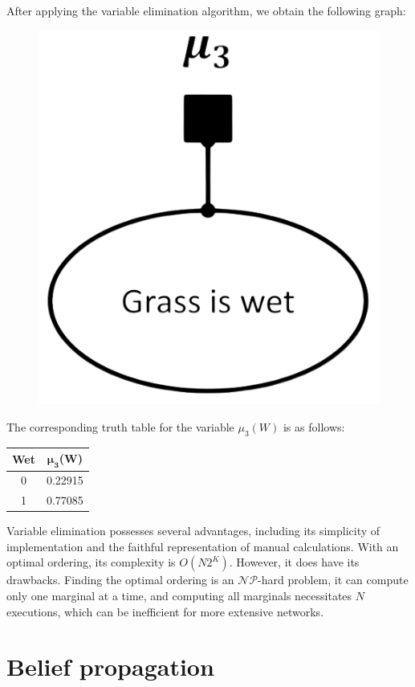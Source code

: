 \documentclass[12pt, a4paper]{report}
\begin{document}
\begin{example}
\begin{figure}[H]
        \end{figure} 
        After applying the variable elimination algorithm, we obtain the following graph:
        \begin{figure}[H]
            \centering
            \includegraphics[width=0.15\linewidth]{images/fg1.png}
        \end{figure} 
        The corresponding truth table for the variable $\mu_3(W)$ is as follows:
        \begin{table}[H]
            \centering
            \begin{tabular}{cc}
            \hline
            \textbf{Wet} & \textbf{$\boldsymbol{\mu_3}$(W)} \\ \hline
            0      & 0.22915  \\
            1      & 0.77085  \\ \hline
            \end{tabular}
        \end{table}
    \end{example}
    Variable elimination possesses several advantages, including its simplicity of implementation and the faithful representation of manual calculations. 
    With an optimal ordering, its complexity is $O(N2^K)$.
    However, it does have its drawbacks. 
    Finding the optimal ordering is an $\mathcal{NP}$-hard problem, it can compute only one marginal at a time, and computing all marginals necessitates $N$ executions, which can be inefficient for more extensive networks.

    \section{Belief propagation}

    
\end{document}
